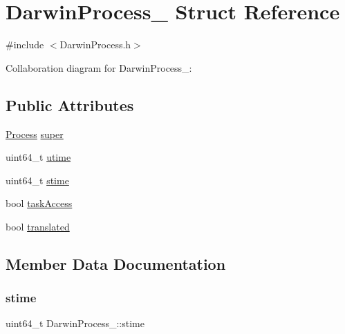 \hypertarget{structDarwinProcess__}{}\section{Darwin\+Process\+\_\+ Struct Reference}
\label{structDarwinProcess__}


{\ttfamily \#include $<$Darwin\+Process.\+h$>$}



Collaboration diagram for Darwin\+Process\+\_\+\+:
\subsection*{Public Attributes}
\begin{DoxyCompactItemize}
\item 
\hyperlink{Process_8h_a20673e8fa40981a168bf0e196c4cef3b}{Process} \hyperlink{structDarwinProcess___a19b74b26f820f958703da69f09895105}{super}
\item 
uint64\+\_\+t \hyperlink{structDarwinProcess___a0d2964ee33949082bb8cedeb622f4b9f}{utime}
\item 
uint64\+\_\+t \hyperlink{structDarwinProcess___a20fae67ced87a85526a16abe0e77e12c}{stime}
\item 
bool \hyperlink{structDarwinProcess___a14f702f4b75cd708adc306b023161cd1}{task\+Access}
\item 
bool \hyperlink{structDarwinProcess___afb0ecb9e0c3b5b2abd79da25bf0e6b81}{translated}
\end{DoxyCompactItemize}


\subsection{Member Data Documentation}
\mbox{\label{structDarwinProcess___a20fae67ced87a85526a16abe0e77e12c}} 
\subsubsection{\texorpdfstring{stime}{stime}}
{\footnotesize\ttfamily uint64\+\_\+t Darwin\+Process\+\_\+\+::stime}

\mbox{\label{structDarwinProcess___a19b74b26f820f958703da69f09895105}} 

